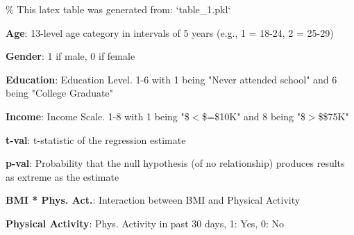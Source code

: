 \documentclass[11pt]{article}
\begin{document}
\begin{codeoutput}
\% This latex table was generated from: `table\_1.pkl`
\begin{table}[h]
\caption{Analysis of relationship between BMI and Diabetes moderated by Physical Activity}
\label{table:bmi\_physactivity}
\begin{threeparttable}
\renewcommand{\TPTminimum}{\linewidth}
\begin{tablenotes}
\footnotesize
\item \textbf{Age}: 13-level age category in intervals of 5 years (e.g., 1 = 18-24, 2 = 25-29)
\item \textbf{Gender}: 1 if male, 0 if female
\item \textbf{Education}: Education Level. 1-6 with 1 being "Never attended school" and 6 being "College Graduate"
\item \textbf{Income}: Income Scale. 1-8 with 1 being "\$$<$\$=\$10K" and 8 being "\$$>$\$\$75K"
\item \textbf{t-val}: t-statistic of the regression estimate
\item \textbf{p-val}: Probability that the null hypothesis (of no relationship) produces results as extreme as the estimate
\item \textbf{BMI * Phys. Act.}: Interaction between BMI and Physical Activity
\item \textbf{Physical Activity}: Phys. Activity in past 30 days, 1: Yes, 0: No
\end{tablenotes}
\end{threeparttable}
\end{table}

\end{codeoutput}
\end{document}
